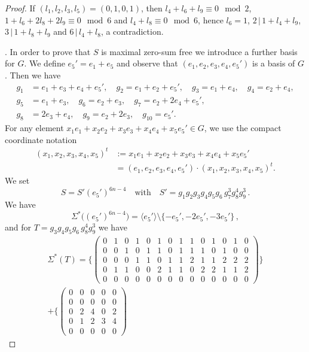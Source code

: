 \documentclass[10pt,a4paper]{amsart}
\renewcommand{\t}{\, | \,}
\begin{document}
\begin{proof}
If $(l_1,l_2,l_3,l_5) = (0,1,0,1)$, then $l_4+l_6+l_9 \equiv 0 \mod
2$, $1+l_6+2l_8+2l_9 \equiv 0 \mod 6$ and $l_4+l_8 \equiv 0 \mod 6$,
hence $l_6=1$, $2 \t 1+l_4+l_9$, $3 \t 1+l_8+l_9$ and $6 \t
l_4+l_8$, a contradiction.

. In order to prove that $S$ is maximal zero-sum free 
we  introduce a further basis for $G$. We define
$e_5' = e_1 + e_5$ and observe that 
$(e_1,e_2,e_3,e_4,e_5')$ is  a basis of $G$. Then we have
\begin{align*}
	g_1&=e_1+e_3+e_4+e_5',\quad g_2=e_1+e_2+e_5',\quad g_3=e_1+e_4,\quad g_4=e_2+e_4,\\
	g_5&=e_1+e_3,\quad g_6=e_2+e_3,\quad g_7=e_2+2e_4+e_5',\\
	g_8&=2e_3+e_4,\quad g_9=e_2+2e_3,\quad g_{10}=e_5'.
\end{align*}
For any element $x_1e_1+x_2e_2+x_3e_3+x_4e_4+x_5e_5' \in G$, we use the compact coordinate notation
\begin{align*}
	(x_1,x_2,x_3,x_4,x_5)^t &:= x_1e_1+x_2e_2+x_3e_3+x_4e_4+x_5e_5'\\
	&=(e_1,e_2,e_3,e_4,e_5')\cdot (x_1,x_2,x_3,x_4,x_5)^t.
\end{align*}
We set
\[
S = S'  (e_5')^{6n-4} \quad \text{with} \quad S' = g_1 g_2 g_3 g_4 g_5 g_6 \, g_7^3 g_8^4 g_9^3 \,.
\]
We have 
\[
\Sigma^*\bigl((e_5')^{6n-4}\bigr) = \langle e_5' \rangle \setminus \{-e_5',-2e_5',-3e_5'\} \,,
\]
and for 
$T = g_3 g_4 g_5 g_6 \, g_8^4 g_9^3$ we have
\begin{align*}
	\Sigma^*(T)=
	\{ \left(\begin{array}{l|l|l|l|l|l|l|l|l|l|l|l|l|l}
		0 & 1 & 0 & 1 & 0 & 1 & 0 & 1 & 1 & 0 & 1 & 0 & 1 & 0\\
		0 & 0 & 1 & 0 & 1 & 1 & 0 & 1 & 1 & 1 & 0 & 1 & 0 & 0\\
		0 & 0 & 0 & 1 & 1 & 0 & 1 & 1 & 2 & 1 & 1 & 2 & 2 & 2\\
		0 & 1 & 1 & 0 & 0 & 2 & 1 & 1 & 0 & 2 & 2 & 1 & 1 & 2\\
		0 & 0 & 0 & 0 & 0 & 0 & 0 & 0 & 0 & 0 & 0 & 0 & 0 & 0
	\end{array}\right)
	\} \\
	+  \{
	\left(\begin{array}{l|l|l|l|l}
		0 & 0 & 0 & 0 & 0\\
		0 & 0 & 0 & 0 & 0\\
		0 & 2 & 4 & 0 & 2\\
		0 & 1 & 2 & 3 & 4\\
		0 & 0 & 0 & 0 & 0
	\end{array}\right)

\end{align*}
\end{proof}
\end{document}
